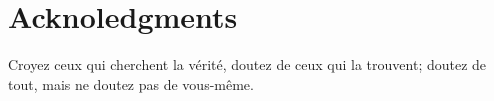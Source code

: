\chapter*{Acknoledgments}

Croyez ceux qui cherchent la vérité, doutez de ceux qui la trouvent; doutez de tout, mais ne doutez pas de vous-même.